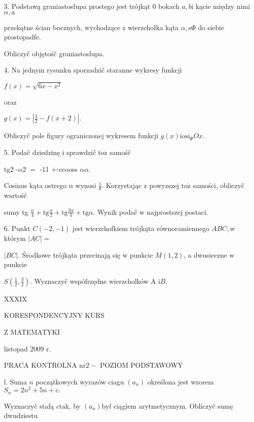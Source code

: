 \documentclass[a4paper,12pt]{article}
\begin{document}
3. Podstawą graniastosłupa prostego jest trójkąt $0$ bokach $a, b\mathrm{i}$ kącie między nimi $\alpha, \mathrm{a}$

przekątne ścian bocznych, wychodzące $\mathrm{z}$ wierzchołka kąta $\alpha, \mathrm{s}\Phi$ do siebie prostopadfe.

Obliczyč objętośč graniastoslupa.

4. Na jednym rysunku sporzadzič staranne wykresy funkcji

$f(x)=\sqrt{6x-x^{2}}$

oraz

$g(x)=|\displaystyle \frac{3}{2}-f(x+2)|.$

Obliczyč pole figury ograniczonej wykresem funkcji $g(x)\mathrm{i}\mathrm{o}\mathrm{s}\mathrm{i}_{\Phi}Ox.$

5. Podač dziedzinę $\mathrm{i}$ sprawdzič $\mathrm{t}\mathrm{o}\dot{\mathrm{z}}$ samośč

tg2 -$\alpha$2 $=$ -11 $+$-ccooss $\alpha\alpha$.

Cosinus kąta ostrego $\alpha$ wynosi $\displaystyle \frac{1}{8}$. Korzystając $\mathrm{z}$ powyzszej $\mathrm{t}\mathrm{o}\dot{\mathrm{z}}$ samości, obliczyč wartośč

sumy tg $\displaystyle \frac{\alpha}{4}+\mathrm{t}\mathrm{g}\frac{\alpha}{2}+\mathrm{t}\mathrm{g}\frac{3\alpha}{4}+\mathrm{t}\mathrm{g}\alpha$. Wynik podač $\mathrm{w}$ najprostszej postaci.

6. Punkt $C(-2,-1)$ jest wierzchofkiem trójkąta równoramiennego $ABC, \mathrm{w}$ którym $|AC|=$

$|BC|$. Środkowe trójkąta przecinają się $\mathrm{w}$ punkcie $M(1,2)$, a dwusieczne $\mathrm{w}$ punkcie

$S(\displaystyle \frac{1}{2},\frac{3}{2})$. Wyznaczyč wspófrzędne wierzcholków A $\mathrm{i}B.$





XXXIX

KORESPONDENCYJNY KURS

Z MATEMATYKI

listopad 2009 r.

PRACA KONTROLNA $\mathrm{n}\mathrm{r} 2-$ POZIOM PODSTAWOWY

l. Suma $n$ początkowych wyrazów ciagu $(a_{n})$ określona jest wzorem $S_{n} =2n^{2}+5n+c.$

Wyznaczyč stafą $c\mathrm{t}\mathrm{a}\mathrm{k}$, by $(a_{n})\mathrm{b}\mathrm{y}l$ ciągiem arytmetycznym. Obliczyč sumę dwudziestu
\end{document}
